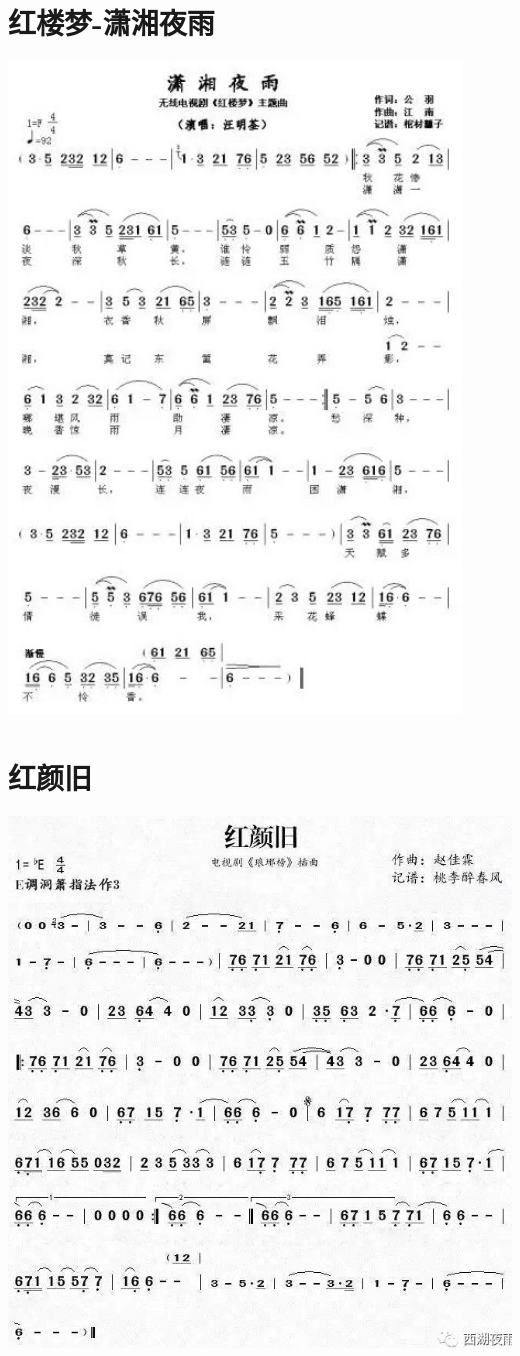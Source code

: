 \documentclass[cn,pad,twocol]{elegantbook}
\begin{document}
\section{红楼梦-潇湘夜雨}\includegraphics[width=0.9\textwidth]{dongxiao/20200819/红楼梦-潇湘夜雨.jpeg}
\section{红颜旧}\includegraphics[width=\textwidth]{dongxiao/20200819/红颜旧.jpeg}
\end{document}
